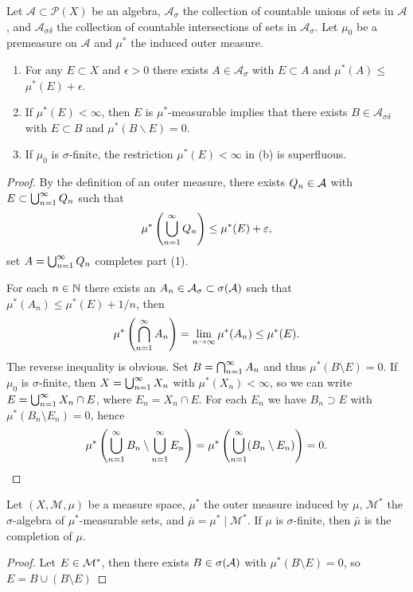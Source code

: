 \begin{exercise}\label{ex1-22}
    Let $\mathcal{A} \subset \mathcal{P}(X)$ be an algebra, $\mathcal{A}_\sigma$ the collection of countable unions of sets in $\mathcal{A}$, and $\mathcal{A}_{\sigma \delta}$ the collection of countable intersections of sets in $\mathcal{A}_\sigma$. Let $\mu_0$ be a premeasure on $\mathcal{A}$ and $\mu^*$ the induced outer measure.
    \begin{enumerate}
    \item For any $E \subset X$ and $\epsilon>0$ there exists $A \in \mathcal{A}_\sigma$ with $E \subset A$ and $\mu^*(A) \leq$ $\mu^*(E)+\epsilon$.
    \item If $\mu^*(E)<\infty$, then $E$ is $\mu^*$-measurable implies that there exists $B \in \mathcal{A}_{\sigma \delta}$ with $E \subset B$ and $\mu^*(B \backslash E)=0$.
    \item If $\mu_0$ is $\sigma$-finite, the restriction $\mu^*(E)<\infty$ in (b) is superfluous. 
    \end{enumerate}
\end{exercise}
\begin{proof}
    By the definition of an outer measure, there exists $Q_n \in \mathcal{A}$ with $E \subset \bigcup_{n=1}^{\infty}Q_n$ such that 
    $$\mu^*\left(\bigcup_{n=1}^{\infty}Q_n\right) \leq \mu^*(E) + \varepsilon, $$
    set $A = \bigcup_{n=1}^{\infty}Q_n$ completes part (1). 

    For each $n \in \mathbb{N}$ there exists an $A_n \in \mathcal{A}_\sigma \subset \sigma(\mathcal{A})$ such that 
    $\mu^*(A_n) \leq \mu^*(E) + 1/n$,
    then 
    $$\mu^*\left(\bigcap_{n=1}^{\infty}A_n\right)
    = \lim_{n \to \infty}\mu^*(A_n) \leq \mu^*(E).$$
    The reverse inequality is obvious. Set $B = \bigcap_{n=1}^{\infty}A_n$ and thus $\mu^*(B \setminus E) = 0$. 
    If $\mu_0$ is $\sigma$-finite, then $X = \bigcup_{n=1}^{\infty}X_n$ with $\mu^*(X_n) < \infty$, so we can write 
    $E = \bigcup_{n=1}^{\infty}X_n \cap E$, where $E_n = X_n \cap E$. For each $E_n$ we have $B_n \supset E$ with $\mu^*(B_n \setminus E_n) = 0$, hence 
    $$\mu^*\left(\bigcup_{n=1}^{\infty}B_n \setminus \bigcup_{n=1}^{\infty}E_n\right) = 
    \mu^*\left(\bigcup_{n=1}^{\infty}(B_n \setminus E_n)\right) = 0.$$
\end{proof}

\begin{exercise}
    Let $(X, \mathcal{M}, \mu)$ be a measure space, $\mu^*$ the outer measure induced by $\mu$, $\mathcal{M}^*$ the $\sigma$-algebra of $\mu^*$-measurable sets, and $\bar{\mu}=\mu^* \mid \mathcal{M}^*$.
    If $\mu$ is $\sigma$-finite, then $\bar{\mu}$ is the completion of $\mu$.
\end{exercise}
\begin{proof}
    Let $E \in \mathcal{M}^*$, then there exists $B \in \sigma(\mathcal{A})$ with $\mu^*(B \setminus E) = 0$, so $E = B \cup (B \setminus E)$
\end{proof}

